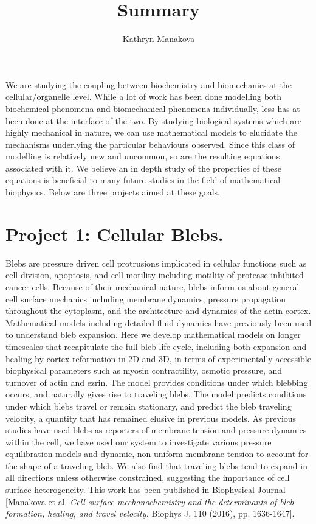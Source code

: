 \documentclass[11pt]{amsart}
\title{Summary}
\author{Kathryn Manakova}
\date{}                                           %
\begin{document}
\maketitle

We are studying the coupling between biochemistry and biomechanics at the cellular/organelle level. While a lot of work has been done modelling both biochemical phenomena and biomechanical phenomena individually, less has at been done at the interface of the two. By studying biological systems which are highly mechanical in nature, we can use mathematical models to elucidate the mechanisms underlying the particular behaviours observed. Since this class of modelling is relatively new and uncommon, so are the resulting equations associated with it. We believe an in depth study of the properties of these equations is beneficial to many future  studies in the field of mathematical biophysics. Below are three projects aimed at these goals. 

\section*{Project 1: Cellular Blebs.}
Blebs are pressure driven cell protrusions implicated in cellular functions such as cell division, apoptosis, and cell motility including motility of protease inhibited cancer cells. Because of their mechanical nature, blebs inform us about general cell surface mechanics including membrane dynamics, pressure propagation throughout the cytoplasm, and the architecture and dynamics of the actin cortex. Mathematical models including detailed fluid dynamics have previously been used to understand bleb expansion. Here we develop mathematical models on longer timescales that recapitulate the full bleb life cycle, including both expansion and healing by cortex reformation in 2D and 3D, in terms of experimentally accessible biophysical parameters such as myosin contractility, osmotic pressure, and turnover of actin and ezrin. The model provides conditions under which blebbing occurs, and naturally gives rise to traveling blebs. The model predicts conditions under which blebs travel or remain stationary, and predict the bleb traveling velocity, a quantity that has remained elusive in previous models.  As previous studies have used blebs as reporters of membrane tension and pressure dynamics within the cell, we have used our system to investigate various pressure equilibration models and dynamic, non-uniform membrane tension to account for the shape of a traveling bleb. We also find that traveling blebs tend to expand in all directions unless otherwise constrained, suggesting the importance of cell surface heterogeneity. This work has been published in Biophysical Journal [Manakova et al. \textit{Cell surface mechanochemistry and the determinants of bleb formation, healing, and travel velocity.} Biophys J, 110 (2016), pp. 1636-1647].
\end{document}
